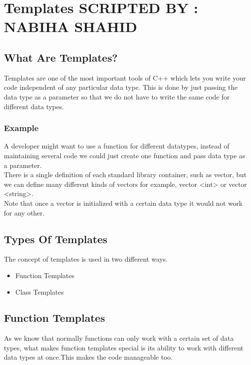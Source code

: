\documentclass[11pt,fleqn]{book} %
\begin{document}
\chapter{Templates \hspace{65mm} {\textsc{\small SCRIPTED BY : NABIHA SHAHID}}}

\section{What Are Templates?}

Templates are one of the most important tools of C++ which lets you write your code independent of any particular data type. This is done by just passing the data type as a parameter so that we do not have to write the same code for different data types.

\subsection{Example}
A developer might want to use a function for different datatypes, instead of maintaining several code we could just create one function and pass data type as a parameter.\\
There is a single definition of each standard library container, such as vector, but we can define many different kinds of vectors for example, vector <int> or vector <string>.\\
Note that once a vector is initialized with a certain data type it would not work for any other.

\section{Types Of Templates}

The concept of templates is used in two different ways.\\
\begin{itemize}
\item Function Templates 
\item Class Templates
\end{itemize}

\section{Function Templates}

As we know that normally functions can only work with a certain set of data types, what makes function templates special is its ability to work with different data types at once.This makes the code manageable too.
\newpage
\end{document}
